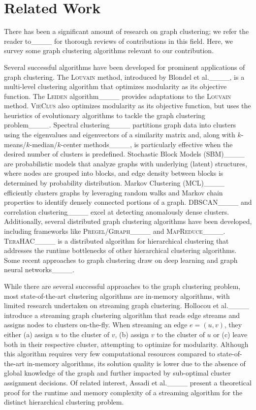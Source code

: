 \section{Related Work}
\label{subsec:related_work}
There has been a significant amount of research on graph clustering; we refer the reader to____ for thorough reviews of contributions in this field. Here, we survey some graph clustering algorithms relevant to our contribution. 

Several successful algorithms have been developed for prominent applications of graph clustering. The \textsc{Louvain} method, introduced by Blondel et al.____, is a multi-level clustering algorithm that optimizes modularity as its objective function. The \textsc{Leiden} algorithm____ provides adaptations to the \textsc{Louvain} method. \textsc{VieClus} also optimizes modularity as its objective function, but uses the heuristics of evolutionary algorithms to tackle the graph clustering problem____.     
Spectral clustering____ partitions graph data into clusters using the eigenvalues and eigenvectors of a similarity matrix and, along with $k$-means/$k$-median/$k$-center methods____, is particularly effective when the desired number of clusters is predefined. Stochastic Block Models (SBM)____ are probabilistic models that analyze graphs with underlying (latent) structures, where nodes are grouped into blocks, and edge density between blocks is determined by probability distribution. Markov Clustering (MCL)____ efficiently clusters graphs by leveraging random walks and Markov chain properties to identify densely connected portions of a graph. \textsc{DBSCAN}____ and correlation clustering____ excel at detecting anomalously dense clusters. 
Additionally, several distributed graph clustering algorithms have been developed, including frameworks like \textsc{Pregel}/\textsc{Giraph}____ and \textsc{MapReduce}____. \textsc{TeraHAC}____ is a distributed algorithm for hierarchical clustering that addresses the runtime bottlenecks of other hierarchical clustering algorithms. Some recent approaches to graph clustering draw on deep learning and graph neural networks____.

While there are several successful approaches to the graph clustering problem, most state-of-the-art clustering algorithms are in-memory algorithms, with limited research undertaken on streaming graph clustering. Hollocou et al.____ introduce a streaming graph clustering algorithm that reads edge streams and assigns nodes to clusters on-the-fly. When streaming an edge $e=(u,v)$, they either (a) assign $u$ to the cluster of $v$, (b) assign $v$ to the cluster of $u$ or (c) leave both in their respective cluster, attempting to optimize for modularity. Although this algorithm requires very few computational resources compared to state-of-the-art in-memory algorithms, its solution quality is lower due to the absence of global knowledge of the graph and further impacted by sub-optimal cluster assignment decisions. Of related interest, Assadi et al.____ present a theoretical proof for the runtime and memory complexity of a streaming algorithm for the distinct hierarchical clustering problem.